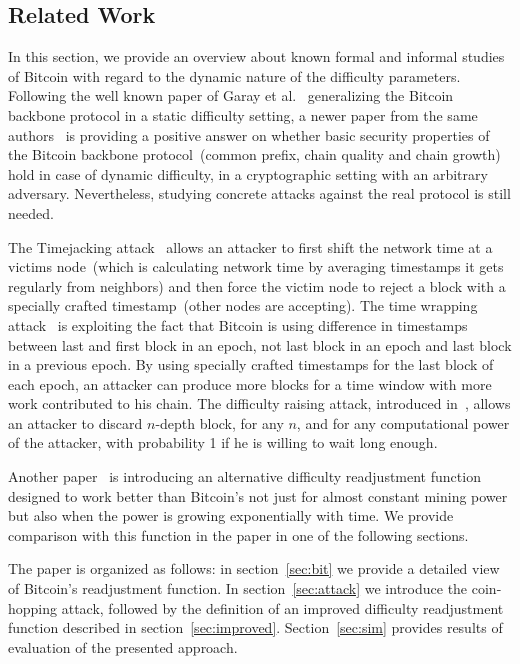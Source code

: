 \documentclass[]{llncs}
\begin{document}
\subsection{Related Work}

In this section, we provide an overview about known formal and informal studies of Bitcoin with regard to the dynamic nature of the difficulty parameters. Following the well known paper of Garay et al.~\cite{garay2015bitcoin} generalizing the Bitcoin backbone protocol in a static difficulty setting, a newer paper from the same authors~\cite{gkl16} is providing a positive answer on whether basic security properties of the Bitcoin backbone protocol~(common prefix, chain quality and chain growth) hold in case of dynamic difficulty, in a cryptographic setting with an arbitrary adversary. Nevertheless, studying concrete attacks against the real protocol is still needed.      

The Timejacking attack~\cite{timejacking2011} allows an attacker to first shift the network time at a victims node~(which is calculating network time by averaging timestamps it gets regularly from neighbors) and then force the victim node to reject a block with a specially crafted timestamp~(other nodes are accepting). The time wrapping attack~\cite{artforz2011} is exploiting the fact that Bitcoin is using difference in timestamps between last and first block in an epoch, not last block in an epoch and last block in a previous epoch. By using specially crafted timestamps for the last block of each epoch, an attacker can produce more blocks for a time window with more work contributed to his chain. The difficulty raising attack, introduced in~\cite{bahack2013theoretical}, allows an attacker to discard $n$-depth block, for any $n$, and for any computational power of the attacker, with probability 1 if he is willing to wait long enough.

Another paper~\cite{kraft2015difficulty} is introducing an alternative difficulty readjustment function designed to work better than Bitcoin's not just for almost constant mining power but also when the power is growing exponentially with time. We provide comparison with this function in the paper in one of the following sections.  

The paper is organized as follows: in section~\ref{sec:bit} we provide a detailed view of Bitcoin's readjustment function. In section~\ref{sec:attack} we introduce the coin-hopping attack, followed by the definition of an improved difficulty readjustment function described in section~\ref{sec:improved}. Section~\ref{sec:sim} provides results of evaluation of the presented approach. 
\end{document}
